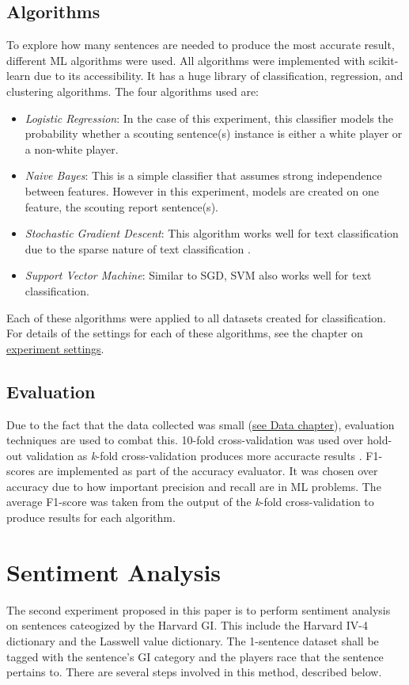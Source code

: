 \documentclass[oneside,12pt]{Classes/RoboticsLaTeX}
\begin{document}
\subsection{Algorithms}
To explore how many sentences are needed to produce the most accurate result, different ML algorithms were used. All algorithms were implemented with scikit-learn \citep{scikit-learn} 
due to its accessibility. It has a huge library of classification, regression, and clustering algorithms. The four algorithms used are:
\begin{itemize}
  \item {\it Logistic Regression}: In the case of this experiment, this classifier models the probability whether a scouting sentence(s) instance is either a white player or a non-white player.
  \item {\it Naive Bayes}: This is a simple classifier that assumes strong independence between features. However in this experiment, models are created on one feature, the scouting report sentence(s).
  \item {\it Stochastic Gradient Descent}: This algorithm works well for text classification due to the sparse nature of text classification \citep{SVM_SGD}.
  \item {\it Support Vector Machine}: Similar to SGD, SVM also works well for text classification.
\end{itemize}
Each of these algorithms were applied to all datasets created for classification. For details of the settings for each of these algorithms, see the chapter on \hyperref[chap:experiments]{experiment settings}.

\subsection{Evaluation}
Due to the fact that the data collected was small (\hyperref[chap:data]{see Data chapter}), evaluation techniques are used to combat this. 10-fold cross-validation was used over hold-out validation
as {\it k}-fold cross-validation produces more accuracte results \citep{k-fold_cross}. F1-scores are implemented as part of the accuracy evaluator. It was chosen over accuracy due to how important
precision and recall are in ML problems. The average F1-score was taken from the output of the {\it k}-fold cross-validation to produce results for each algorithm.

\section{Sentiment Analysis}
The second experiment proposed in this paper is to perform sentiment analysis on sentences cateogized by the Harvard GI. This include the Harvard IV-4 dictionary and the Lasswell value dictionary.
The 1-sentence dataset shall be tagged with the sentence's GI category and the players race that the sentence pertains to. There are several steps involved in this method, described below.
\end{document}

